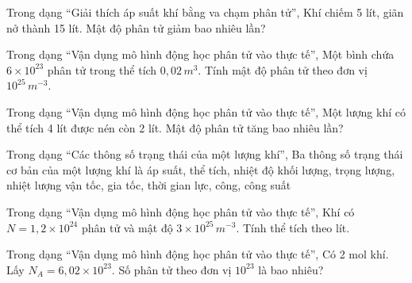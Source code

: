 \begin{ex}
Trong dạng “Giải thích áp suất khí bằng va chạm phân tử”, Khí chiếm 5 lít, giãn nở thành 15 lít. Mật độ phân tử giảm bao nhiêu lần?
\end{ex}

\begin{ex}
Trong dạng “Vận dụng mô hình động học phân tử vào thực tế”, Một bình chứa $6\times10^{23}$ phân tử trong thể tích $0,02\,m^3$. Tính mật độ phân tử theo đơn vị $10^{25}\,m^{-3}$.
\end{ex}

\begin{ex}
Trong dạng “Vận dụng mô hình động học phân tử vào thực tế”, Một lượng khí có thể tích 4 lít được nén còn 2 lít. Mật độ phân tử tăng bao nhiêu lần?
\end{ex}

\begin{ex}
Trong dạng “Các thông số trạng thái của một lượng khí”, Ba thông số trạng thái cơ bản của một lượng khí là
\choice
{\True áp suất, thể tích, nhiệt độ}
{khối lượng, trọng lượng, nhiệt lượng}
{vận tốc, gia tốc, thời gian}
{lực, công, công suất}
\end{ex}

\begin{ex}
Trong dạng “Vận dụng mô hình động học phân tử vào thực tế”, Khí có $N=1,2\times10^{24}$ phân tử và mật độ $3\times10^{25}\,m^{-3}$. Tính thể tích theo lít.
\end{ex}

\begin{ex}
Trong dạng “Vận dụng mô hình động học phân tử vào thực tế”, Có 2 mol khí. Lấy $N_A=6,02\times10^{23}$. Số phân tử theo đơn vị $10^{23}$ là bao nhiêu?
\end{ex}

